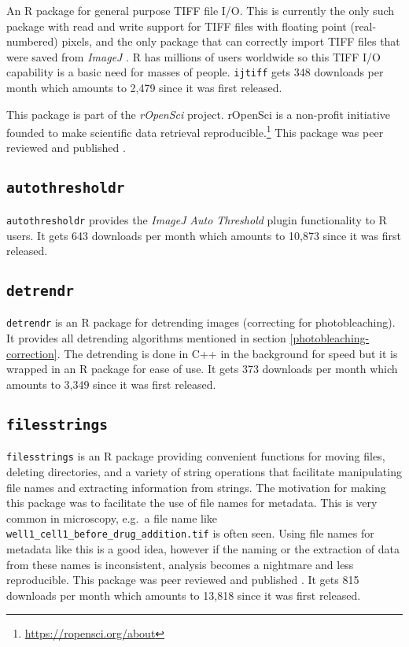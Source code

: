 \documentclass[12pt,]{book}
\let\rmarkdownfootnote\footnote%
\def\footnote{\protect\rmarkdownfootnote}
\theoremstyle{definition}
\theoremstyle{definition}
\theoremstyle{definition}
\theoremstyle{remark}
\begin{document}
An R package for general purpose TIFF file I/O. This is currently the
only such package with read and write support for TIFF files with
floating point (real-numbered) pixels, and the only package that can
correctly import TIFF files that were saved from \emph{ImageJ}
\citep{ImageJ}. R has millions of users worldwide so this TIFF I/O
capability is a basic need for masses of people. \texttt{ijtiff} gets
348 downloads per month which amounts to 2,479 since it was first
released.

This package is part of the \emph{rOpenSci} project. rOpenSci is a
non-profit initiative founded to make scientific data retrieval
reproducible.\footnote{\url{https://ropensci.org/about}} This package
was peer reviewed and published \citep{ijtiff}.

\subsection{\texorpdfstring{\texttt{autothresholdr}}{autothresholdr}}\label{autothresholdr}

\texttt{autothresholdr} provides the \emph{ImageJ} \citep{ImageJ}
\emph{Auto Threshold} plugin \citep{autothresholdr} functionality to R
users. It gets 643 downloads per month which amounts to 10,873 since it
was first released.

\subsection{\texorpdfstring{\texttt{detrendr}}{detrendr}}\label{detrendr}

\texttt{detrendr} is an R package for detrending images (correcting for
photobleaching). It provides all detrending algorithms mentioned in
section \ref{photobleaching-correction}. The detrending is done in C++
in the background for speed but it is wrapped in an R package for ease
of use. It gets 373 downloads per month which amounts to 3,349 since it
was first released.

\subsection{\texorpdfstring{\texttt{filesstrings}}{filesstrings}}\label{filesstrings}

\texttt{filesstrings} is an R package providing convenient functions for
moving files, deleting directories, and a variety of string operations
that facilitate manipulating file names and extracting information from
strings. The motivation for making this package was to facilitate the
use of file names for metadata. This is very common in microscopy,
e.g.~a file name like \texttt{well1\_cell1\_before\_drug\_addition.tif}
is often seen. Using file names for metadata like this is a good idea,
however if the naming or the extraction of data from these names is
inconsistent, analysis becomes a nightmare and less reproducible. This
package was peer reviewed and published \citep{filesstrings}. It gets
815 downloads per month which amounts to 13,818 since it was first
released.
\end{document}
